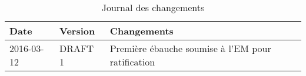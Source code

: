 \thispagestyle{default}

%

\begin{table}[h]

    \centering

    \begin{tabularx}{\textwidth}{ @{} p{3cm} p{3cm} X @{} }

        \textbf{Date} & \textbf{Version} & \textbf{Changements}\\ \toprule

    	2016-03-12 & DRAFT 1 & Première ébauche soumise à l'EM pour ratification\\ 
    	
    	\bottomrule
    	

    \end{tabularx}

    \caption[Changements]{Journal des changements}

    \label{record-of-changes}

\end{table} 